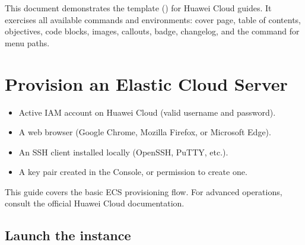 \documentclass{guide}
\begin{document}
\makecover

\maketoc

\startbody

\begin{infobox}
This document demonstrates the  template () for
Huawei Cloud guides. It exercises all available commands and environments:
cover page, table of contents, objectives, code blocks, images, callouts,
badge, changelog, and the  command for menu paths.
\end{infobox}

\section{Provision an Elastic Cloud Server}

\begin{objectives}

  \prerequisites
  \begin{itemize}
    \item Active IAM account on Huawei Cloud (valid username and password).
    \item A web browser (Google Chrome, Mozilla Firefox, or Microsoft Edge).
    \item An SSH client installed locally (OpenSSH, PuTTY, etc.).
    \item A key pair created in the Console, or permission to create one.
  \end{itemize}
\end{objectives}

\begin{infobox}
This guide covers the basic ECS provisioning flow. For advanced operations,
consult the official Huawei Cloud documentation.
\end{infobox}

\subsection{Launch the instance}
\end{document}
